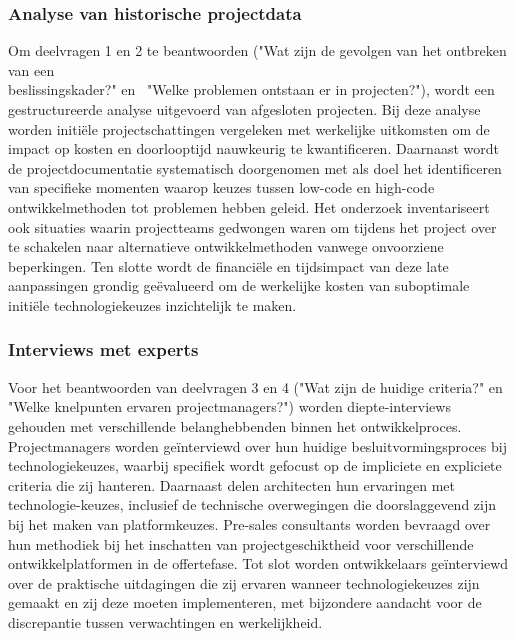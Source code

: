 \subsubsection{Analyse van historische projectdata}
Om deelvragen 1 en 2 te beantwoorden ("Wat zijn de gevolgen van het ontbreken van een \\ beslissingskader?" \; \hbox{en} \, "Welke problemen ontstaan er in projecten?"), wordt een gestructureerde analyse uitgevoerd van afgesloten projecten. Bij deze analyse worden initiële projectschattingen vergeleken met werkelijke uitkomsten om de impact op kosten en doorlooptijd nauwkeurig te kwantificeren. Daarnaast wordt de projectdocumentatie systematisch doorgenomen met als doel het identificeren van specifieke momenten waarop keuzes tussen low-code en high-code ontwikkelmethoden tot problemen hebben geleid. Het onderzoek inventariseert ook situaties waarin projectteams gedwongen waren om tijdens het project over te schakelen naar alternatieve ontwikkelmethoden vanwege onvoorziene beperkingen. Ten slotte wordt de financiële en tijdsimpact van deze late aanpassingen grondig geëvalueerd om de werkelijke kosten van suboptimale initiële technologiekeuzes inzichtelijk te maken.
\subsubsection{Interviews met experts}
Voor het beantwoorden van deelvragen 3 en 4 ("Wat zijn de huidige criteria?" \; \hbox{en} \, "Welke knelpunten ervaren projectmanagers?") worden diepte-interviews gehouden met verschillende belanghebbenden binnen het ontwikkelproces. Projectmanagers worden geïnterviewd over hun huidige besluitvormingsproces bij technologiekeuzes, waarbij specifiek wordt gefocust op de impliciete en expliciete criteria die zij hanteren. Daarnaast delen architecten hun ervaringen met technologie-keuzes, inclusief de technische overwegingen die doorslaggevend zijn bij het maken van platformkeuzes. Pre-sales consultants worden bevraagd over hun methodiek bij het inschatten van projectgeschiktheid voor verschillende ontwikkelplatformen in de offertefase. Tot slot worden ontwikkelaars geïnterviewd over de praktische uitdagingen die zij ervaren wanneer technologiekeuzes zijn gemaakt en zij deze moeten implementeren, met bijzondere aandacht voor de discrepantie tussen verwachtingen en werkelijkheid.
